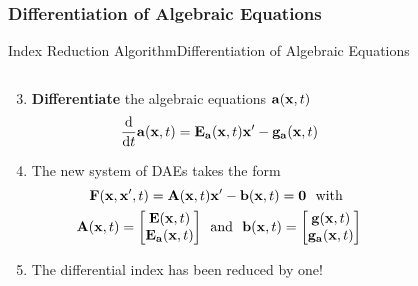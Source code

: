\subsubsection{Differentiation of Algebraic Equations}

\begin{frame}{Index Reduction Algorithm}{Differentiation of Algebraic Equations}
  \vspace{-1.0em}
  \begin{columns}
    \begin{column}[c]{0.6\textwidth}
      \begin{enumerate}[<+->]\setcounter{enumi}{2}
        \item \textbf{Differentiate} the algebraic equations $\mathbf{a}(\mathbf{x}, t)$
        \begin{equation*}
          \dfrac{\text{d}}{\text{d}t} \mathbf{a}(\mathbf{x}, t) = \mathbf{E}_{\mathbf{a}}(\mathbf{x}, t) \mathbf{x}^\prime - \mathbf{g}_{\mathbf{a}}(\mathbf{x}, t)
        \end{equation*}
        \item The new system of \acsp{DAE} takes the form
        \begin{align*}
          \mathbf{F}(\mathbf{x}, \mathbf{x}^\prime, t) = \mathbf{A}(\mathbf{x}, t) &\mathbf{x}^\prime - \mathbf{b}(\mathbf{x}, t) = \mathbf{0} ~~ \text{with} \\
          \mathbf{A}(\mathbf{x}, t) = \begin{bmatrix} \mathbf{E}(\mathbf{x}, t) \\ \mathbf{E}_{\mathbf{a}}(\mathbf{x}, t) \end{bmatrix}
          ~~ &\text{and} ~~
          \mathbf{b}(\mathbf{x}, t) = \begin{bmatrix} \mathbf{g}(\mathbf{x}, t) \\ \mathbf{g}_{\mathbf{a}}(\mathbf{x}, t) \end{bmatrix}
        \end{align*}
        \item The differential index has been reduced by one!
      \end{enumerate}
    \end{column}
    \begin{column}[c]{0.4\textwidth}
    \end{column}
  \end{columns}
\end{frame}

